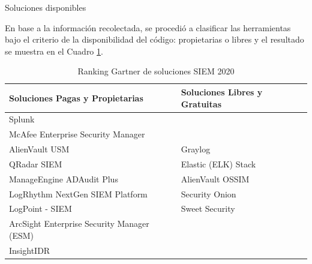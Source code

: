 \begin{section}{Soluciones disponibles}
\begin{center}
\begin{table}[H]
        \caption{Ranking Gartner \cite{ranking} de soluciones SIEM 2020}
        \label{table:2}
    \end{table}
    \end{center}
    \FloatBarrier
    En base a la información recolectada, se procedió a clasificar las herramientas bajo el criterio de la disponibilidad del código: propietarias o libres y el resultado se muestra en el Cuadro \ref{table:3}.
        \begin{table}[h]
        \begin{tabular}{ | m{22em}| m{17em} | } 
            \hline
            Soluciones Pagas y Propietarias & Soluciones Libres y Gratuitas  \\ 
            \hline
            Splunk\cite{splunk} &  \\ 
            
            McAfee Enterprise Security Manager\cite{enterprise} &  \\
            
            AlienVault USM\cite{alienvault_usm} & Graylog\cite{graylog} \\ 
             
            QRadar SIEM \cite{qradar} & Elastic (ELK) Stack\cite{elastic}  \\
             
            ManageEngine ADAudit Plus\cite{adaudit} & AlienVault OSSIM\cite{alienvault_ossim}  \\
             
            LogRhythm NextGen SIEM Platform\cite{logrhythm} & Security Onion\cite{sonion}  \\
             
            LogPoint - SIEM\cite{logpoint} & Sweet Security\cite{sweet_security}  \\
             
            ArcSight Enterprise Security Manager (ESM)\cite{arcsight} &   \\
             
            InsightIDR\cite{insight} &   \\
             
            \hline %
        \end{tabular}
        \caption{Ranking Gartner \cite{ranking} de soluciones SIEM 2020}
        \label{table:3}
    \end{table}
    
    \pagebreak
    

\end{section}

